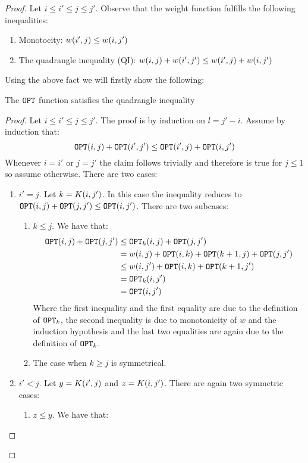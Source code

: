 \begin{theorem}
\begin{proof}
Let $i \leq i' \leq j \leq j'$.
Observe that the weight function fulfills the following inequalities:
\begin{enumerate}
\item Monotocity: $w\mathopen{}\left( i',j \right)\leq w\mathopen{}\left( i,j' \right)$
\item The quadrangle inequality (QI):
$
w\mathopen{}\left( i,j \right) + w\mathopen{}\left( i',j' \right)\leq 
w\mathopen{}\left( i',j \right) + w\mathopen{}\left( i,j' \right)
$
\end{enumerate}
Using the above fact we will firstly show the following:
\begin{lemma}
   The $\texttt{OPT}$ function satisfies the quadrangle inequality
   \begin{proof}
       Let $i \leq i' \leq j \leq j'$. The proof is by induction on $l=j'-i$. Assume by induction that:
       $$\texttt{OPT}\mathopen{}\left( i,j \right) + \texttt{OPT}\mathopen{}\left( i',j' \right)\leq 
\texttt{OPT}\mathopen{}\left( i',j \right) + \texttt{OPT}\mathopen{}\left( i,j' \right)$$
Whenever $i=i'$ or $j=j'$ the claim follows trivially and therefore is true for $j\leq 1$ so assume otherwise. There are two cases:
\begin{enumerate}
   \item $i'=j$.
   Let $k=K\mathopen{}\left( i,j' \right)$. In this case the inequality reduces to $\texttt{OPT}\mathopen{}\left( i,j \right) + \texttt{OPT}\mathopen{}\left( j,j' \right)\leq \texttt{OPT}\mathopen{}\left( i,j' \right)$. There are two subcases:
   \begin{enumerate}
       \item $k\leq j$.
       We have that:
       \begin{align*}
       \texttt{OPT}\mathopen{}\left( i, j \right) + \texttt{OPT}\mathopen{}\left( j, j' \right) &\leq \texttt{OPT}_k\mathopen{}\left( i, j \right) + \texttt{OPT}\mathopen{}\left( j, j' \right) 
       \\ 
       &= 
       w\mathopen{}\left( i, j \right) + \texttt{OPT}\mathopen{}\left( i, k \right) + \texttt{OPT}\mathopen{}\left( k+1, j \right) + \texttt{OPT}\mathopen{}\left( j, j' \right)
       \\ 
       &\leq
       w\mathopen{}\left( i, j' \right) + \texttt{OPT}\mathopen{}\left( i, k \right) + \texttt{OPT}\mathopen{}\left( k+1, j' \right) 
       \\
       &=
       \texttt{OPT}_k\mathopen{}\left( i, j' \right) \\
       &= \texttt{OPT}\mathopen{}\left( i, j' \right)
       \end{align*}
       Where the first inequality and the first equality are due to the definition of $\texttt{OPT}_k$, the second inequality is due to monotonicity of $w$ and the induction hypothesis and the last two equalities are again due to the definition of $\texttt{OPT}_k$.
        \item The case when $k\geq j$ is symmetrical.
   \end{enumerate}
    \item $i' < j$.
    Let $y=K\mathopen{}\left( i',j \right)$ and $z=K\mathopen{}\left( i,j' \right)$. There are again two symmetric cases:
    \begin{enumerate}
        \item $z\leq y$. We have that:

\end{enumerate}
\end{enumerate}
\end{proof}
\end{lemma}
\end{proof}
\end{theorem}
